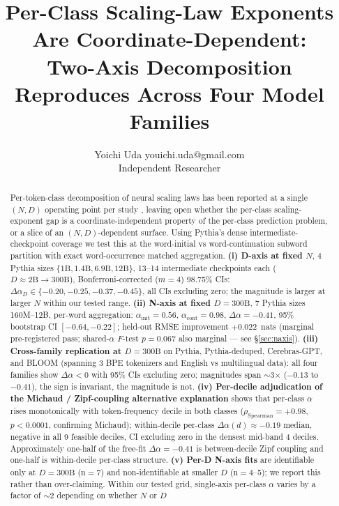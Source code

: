 \documentclass[10pt]{article}
\title{Per-Class Scaling-Law Exponents Are Coordinate-Dependent:\\
       Two-Axis Decomposition Reproduces Across Four Model Families}
\author{\name Yoichi Uda \email youichi.uda@gmail.com \\
        \addr Independent Researcher}
\newcommand{\dalpha}{\Delta\alpha}
\newcommand{\ainit}{\alpha_\mathrm{init}}
\newcommand{\acont}{\alpha_\mathrm{cont}}
\begin{document}
\maketitle

\begin{abstract}
Per-token-class decomposition of neural scaling laws has been reported
at a single $(N, D)$ operating point per study \citep{michaud2023quantization, oh2024surprisal},
leaving open whether the per-class scaling-exponent gap is a
coordinate-independent property of the per-class prediction problem,
or a slice of an $(N, D)$-dependent surface. Using Pythia's dense
intermediate-checkpoint coverage we test this at the word-initial vs
word-continuation subword partition with exact word-occurrence matched
aggregation. \textbf{(i) D-axis at fixed $N$}, 4 Pythia sizes
$\{\text{1B},\text{1.4B},\text{6.9B},\text{12B}\}$, 13--14 intermediate
checkpoints each ($D \approx 2\text{B} \to 300\text{B}$),
Bonferroni-corrected ($m{=}4$) 98.75\% CIs: $\dalpha_D \in
\{-0.20, -0.25, -0.37, -0.45\}$, all CIs excluding zero; the magnitude is
larger at larger $N$ within our tested range. \textbf{(ii) N-axis at
fixed $D{=}300\text{B}$}, 7 Pythia sizes 160M--12B, per-word
aggregation: $\ainit{=}0.56$, $\acont{=}0.98$, $\dalpha{=}-0.41$, 95\%
bootstrap CI $[-0.64, -0.22]$; held-out RMSE improvement
$+0.022$~nats (marginal pre-registered pass; shared-$\alpha$
$F$-test $p = 0.067$ also marginal --- see \S\ref{sec:naxis}). \textbf{(iii)
Cross-family replication at $D{=}300\text{B}$} on Pythia, Pythia-deduped,
Cerebras-GPT, and BLOOM (spanning 3 BPE tokenizers and English vs
multilingual data): all four families show $\dalpha < 0$ with 95\% CIs
excluding zero; magnitudes span $\sim$3$\times$ ($-0.13$ to $-0.41$),
the sign is invariant, the magnitude is not. \textbf{(iv) Per-decile
adjudication of the Michaud / Zipf-coupling alternative explanation}
shows that per-class $\alpha$ rises monotonically with token-frequency
decile in both classes ($\rho_\mathrm{Spearman} = +0.98$,
$p < 0.0001$, confirming Michaud); within-decile per-class
$\dalpha(d) \approx -0.19$ median, negative in all 9 feasible deciles,
CI excluding zero in the densest mid-band 4 deciles. Approximately
one-half of the free-fit $\dalpha = -0.41$ is between-decile Zipf
coupling and one-half is within-decile per-class structure.
\textbf{(v) Per-D N-axis fits} are identifiable only at $D{=}300\text{B}$
(n${=}$7) and non-identifiable at smaller $D$ (n${=}$4--5); we report
this rather than over-claiming. Within our tested grid, single-axis per-class
$\alpha$ varies by a factor of $\sim$2 depending on whether $N$ or $D$

\end{abstract}
\end{document}

